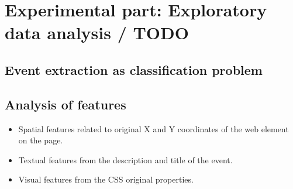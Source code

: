 \chapter{Experimental part: Exploratory data analysis / TODO}
\label{chap:dataexplore}
\section{Event extraction as classification problem}
\section{Analysis of features}

\begin{itemize}
\item Spatial features related to original X and Y coordinates of the web element on the page.
\item Textual features from the description and title of the event. 
\item Visual features from the CSS original properties.  
\end{itemize}

